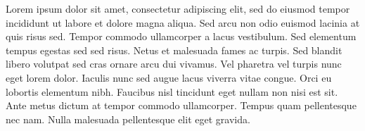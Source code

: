 
Lorem ipsum dolor sit amet, consectetur adipiscing elit, sed do eiusmod tempor
incididunt ut labore et dolore magna aliqua. Sed arcu non odio euismod lacinia
at quis risus sed. Tempor commodo ullamcorper a lacus vestibulum. Sed elementum
tempus egestas sed sed risus. Netus et malesuada fames ac turpis. Sed blandit
libero volutpat sed cras ornare arcu dui vivamus. Vel pharetra vel turpis nunc
eget lorem dolor. Iaculis nunc sed augue lacus viverra vitae congue. Orci eu
lobortis elementum nibh. Faucibus nisl tincidunt eget nullam non nisi est sit.
Ante metus dictum at tempor commodo ullamcorper. Tempus quam pellentesque nec
nam. Nulla malesuada pellentesque elit eget gravida.
